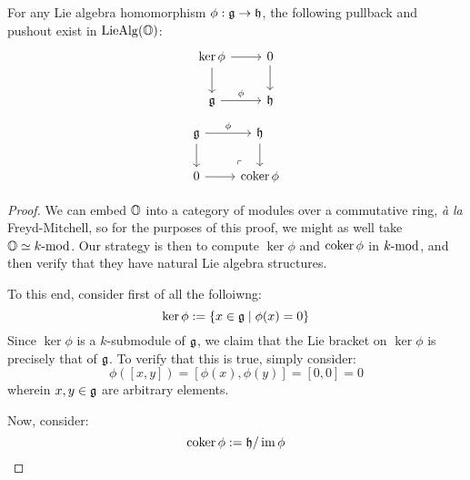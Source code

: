                     \begin{proposition} \label{prop: (co)kernels_of_lie_algebra_homomorphisms}
                        For any Lie algebra homomorphism $\phi: \g \to \h$, the following pullback and pushout exist in $\Lie\Alg(\O)$:
                            $$
                                \begin{tikzcd}
                                	{\ker \phi} & 0 \\
                                	\g & \h
                                	\arrow["\phi", from=2-1, to=2-2]
                                	\arrow[from=1-1, to=2-1]
                                	\arrow[from=1-1, to=1-2]
                                	\arrow[from=1-2, to=2-2]
                                \end{tikzcd}
                            $$
                            $$
                                \begin{tikzcd}
                                	\g & \h \\
                                	0 & {\coker \phi}
                                	\arrow["\phi", from=1-1, to=1-2]
                                	\arrow[from=1-1, to=2-1]
                                	\arrow[from=2-1, to=2-2]
                                	\arrow[from=1-2, to=2-2]
                                	\arrow["\lrcorner"{anchor=center, pos=0.125, rotate=180}, draw=none, from=2-2, to=1-1]
                                \end{tikzcd}
                            $$
                    \end{proposition}
                        \begin{proof}
                            We can embed $\O$ into a category of modules over a commutative ring, \textit{\`a la} Freyd-Mitchell, so for the purposes of this proof, we might as well take $\O \cong k\mod$. Our strategy is then to compute $\ker \phi$ and $\coker \phi$ in $k\mod$, and then verify that they have natural Lie algebra structures. 
                            
                            To this end, consider first of all the folloiwng:
                                $$\ker \phi := \{x \in \g \mid \phi(x) = 0\}$$
                            Since $\ker \phi$ is a $k$-submodule of $\g$, we claim that the Lie bracket on $\ker \phi$ is precisely that of $\g$. To verify that this is true, simply consider:
                                $$\phi([x, y]) = [\phi(x), \phi(y)] = [0, 0] = 0$$
                            wherein $x, y \in \g$ are arbitrary elements. 
                            
                            Now, consider:
                                $$\coker \phi := \h/\im\phi$$
                        \end{proof}
                    
